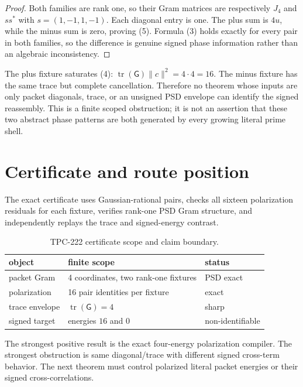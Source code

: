 \documentclass[11pt]{article}
\newcommand{\G}{\mathsf G}
\begin{document}
\begin{proof}
Both families are rank one, so their Gram matrices are respectively
$J_4$ and $s s^*$ with $s=(1,-1,1,-1)$.  Each diagonal entry is one.  The plus sum is
$4u$, while the minus sum is zero, proving (5).  Formula (3) holds exactly for every
pair in both families, so the difference is genuine signed phase information rather than
an algebraic inconsistency.
\end{proof}

The plus fixture saturates (4): $\operatorname{tr}(\G)\|c\|^2=4\cdot4=16$.  The minus
fixture has the same trace but complete cancellation.  Therefore no theorem whose inputs
are only packet diagonals, trace, or an unsigned PSD envelope can identify the signed
reassembly.  This is a finite scoped obstruction; it is not an assertion that these two
abstract phase patterns are both generated by every growing literal prime shell.

\section{Certificate and route position}

The exact certificate uses Gaussian-rational pairs, checks all sixteen polarization
residuals for each fixture, verifies rank-one PSD Gram structure, and independently replays
the trace and signed-energy contrast.

\begin{table}[t]
\centering
\begin{tabular}{lll}
\toprule
object & finite scope & status\\
\midrule
packet Gram & 4 coordinates, two rank-one fixtures & PSD exact\\
polarization & 16 pair identities per fixture & exact\\
trace envelope & $\operatorname{tr}(\G)=4$ & sharp\\
signed target & energies $16$ and $0$ & non-identifiable\\
\bottomrule
\end{tabular}
\caption{TPC-222 certificate scope and claim boundary.}
\end{table}

The strongest positive result is the exact four-energy polarization compiler.  The strongest
obstruction is same diagonal/trace with different signed cross-term behavior.  The next
theorem must control polarized literal packet energies or their signed cross-correlations.
\end{document}
